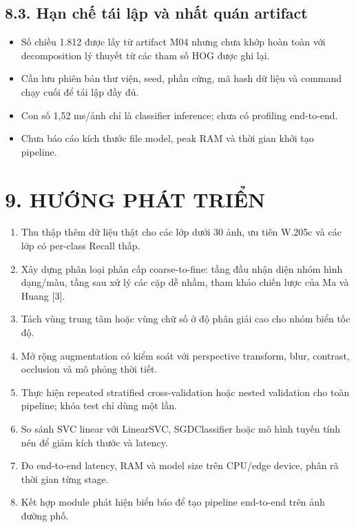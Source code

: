 \documentclass[12pt,a4paper]{article}
\begin{document}
\subsection{8.3. Hạn chế tái lập và nhất quán
artifact}\label{hux1ea1n-chux1ebf-tuxe1i-lux1eadp-vuxe0-nhux1ea5t-quuxe1n-artifact}

\begin{itemize}
\item
  Số chiều 1.812 được lấy từ artifact M04 nhưng chưa khớp hoàn toàn với
  decomposition lý thuyết từ các tham số HOG được ghi lại.
\item
  Cần lưu phiên bản thư viện, seed, phần cứng, mã hash dữ liệu và
  command chạy cuối để tái lập đầy đủ.
\item
  Con số 1,52 ms/ảnh chỉ là classifier inference; chưa có profiling
  end-to-end.
\item
  Chưa báo cáo kích thước file model, peak RAM và thời gian khởi tạo
  pipeline.
\end{itemize}

\section{9. HƯỚNG PHÁT TRIỂN}\label{hux1b0ux1edbng-phuxe1t-triux1ec3n}

\begin{enumerate}
\def\labelenumi{\arabic{enumi}.}
\setcounter{enumi}{10}
\item
  Thu thập thêm dữ liệu thật cho các lớp dưới 30 ảnh, ưu tiên W.205c và
  các lớp có per-class Recall thấp.
\item
  Xây dựng phân loại phân cấp coarse-to-fine: tầng đầu nhận diện nhóm
  hình dạng/màu, tầng sau xử lý các cặp dễ nhầm, tham khảo chiến lược
  của Ma và Huang {[}3{]}.
\item
  Tách vùng trung tâm hoặc vùng chữ số ở độ phân giải cao cho nhóm biển
  tốc độ.
\item
  Mở rộng augmentation có kiểm soát với perspective transform, blur,
  contrast, occlusion và mô phỏng thời tiết.
\item
  Thực hiện repeated stratified cross-validation hoặc nested validation
  cho toàn pipeline; khóa test chỉ dùng một lần.
\item
  So sánh SVC linear với LinearSVC, SGDClassifier hoặc mô hình tuyến
  tính nén để giảm kích thước và latency.
\item
  Đo end-to-end latency, RAM và model size trên CPU/edge device, phân rã
  thời gian từng stage.
\item
  Kết hợp module phát hiện biển báo để tạo pipeline end-to-end trên ảnh
  đường phố.
\end{enumerate}
\end{document}
